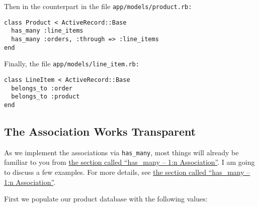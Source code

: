 \documentclass[a4paper]{book}
\newcounter{tab}[chapter]
\begin{document}
Then in the counterpart in the file \texttt{app/models/product.rb:}

\begin{shaded}\begin{verbatim}
class Product < ActiveRecord::Base
  has_many :line_items
  has_many :orders, :through => :line_items
end
\end{verbatim}\end{shaded}

Finally, the file \texttt{app/models/line\_item.rb:}

\begin{shaded}\begin{verbatim}
class LineItem < ActiveRecord::Base
  belongs_to :order
  belongs_to :product
end
\end{verbatim}\end{shaded}

\subsection{The Association Works Transparent}\label{the-association-works-transparent}

As we implement the associations via \texttt{has\_many}, most things will already be familiar to you from \hyperref[activerecordux5fhasux5fmany]{the section called “has\_many -- 1:n Association”}. I am going to discuss a few examples. For more details, see \hyperref[activerecordux5fhasux5fmany]{the section called “has\_many -- 1:n Association”}.

First we populate our product database with the following values:
\end{document}
